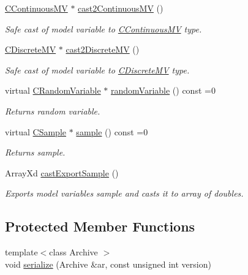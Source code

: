 \begin{DoxyCompactItemize}
\hyperlink{class_go_s_u_m_1_1_c_continuous_m_v}{C\-Continuous\-M\-V} $\ast$ \hyperlink{class_go_s_u_m_1_1_c_model_variable_a76ad39dc00e51af83d00b47a03d191a7}{cast2\-Continuous\-M\-V} ()
\begin{DoxyCompactList}\small\item\em Safe cast of model variable to \hyperlink{class_go_s_u_m_1_1_c_continuous_m_v}{C\-Continuous\-M\-V} type. \end{DoxyCompactList}\item 
\hyperlink{class_go_s_u_m_1_1_c_discrete_m_v}{C\-Discrete\-M\-V} $\ast$ \hyperlink{class_go_s_u_m_1_1_c_model_variable_a5d53861a7d2e7f9030a9a857698662da}{cast2\-Discrete\-M\-V} ()
\begin{DoxyCompactList}\small\item\em Safe cast of model variable to \hyperlink{class_go_s_u_m_1_1_c_discrete_m_v}{C\-Discrete\-M\-V} type. \end{DoxyCompactList}\item 
virtual \hyperlink{class_c_random_variable}{C\-Random\-Variable} $\ast$ \hyperlink{class_go_s_u_m_1_1_c_model_variable_ae12d28329d27f1b85085c8e0fc310739}{random\-Variable} () const =0
\begin{DoxyCompactList}\small\item\em Returns random variable. \end{DoxyCompactList}\item 
virtual \hyperlink{class_c_sample}{C\-Sample} $\ast$ \hyperlink{class_go_s_u_m_1_1_c_model_variable_a4f5739cec4081b98efc26c1c8bde690e}{sample} () const =0
\begin{DoxyCompactList}\small\item\em Returns sample. \end{DoxyCompactList}\item 
Array\-Xd \hyperlink{class_go_s_u_m_1_1_c_model_variable_a4956d33b5e6b10c2772d04db9379d467}{cast\-Export\-Sample} ()
\begin{DoxyCompactList}\small\item\em Exports model variables sample and casts it to array of doubles. \end{DoxyCompactList}\end{DoxyCompactItemize}
\subsection*{Protected Member Functions}
\begin{DoxyCompactItemize}
\item 
{\footnotesize template$<$class Archive $>$ }\\void \hyperlink{class_go_s_u_m_1_1_c_model_variable_ac65c599cd7344f263ec632db106b04f3}{serialize} (Archive \&ar, const unsigned int version)
\end{DoxyCompactItemize}
